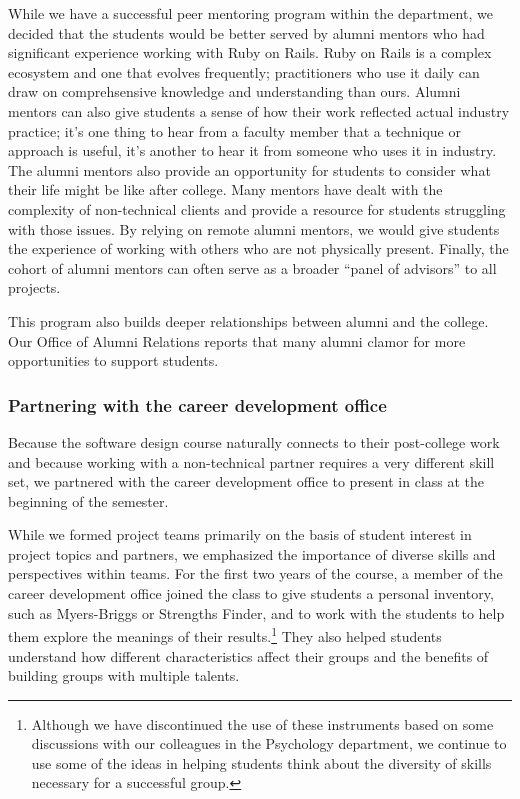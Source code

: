 While we have a successful peer mentoring program within the department,
we decided that the students would be better served by alumni mentors
who had significant experience working with Ruby on Rails.
Ruby on Rails is a complex ecosystem and one that evolves
frequently; practitioners who use it daily can draw on
comprehsensive knowledge and understanding than ours.  Alumni mentors
can also give students a sense of how their work
reflected actual industry practice; it's one thing to hear from a
faculty member that a technique or approach is useful, it's another
to hear it from someone who uses it in industry.  The
alumni mentors also provide an opportunity for students to consider
what their life might be like after college.  Many mentors have
dealt with the complexity of non-technical clients and provide a
resource for students struggling with those issues.  By relying on
remote alumni mentors, we would give students the experience of
working with others who are not physically present.  Finally, the
cohort of alumni mentors can often serve as a broader ``panel of
advisors'' to all projects.

This program also builds deeper relationships between
alumni and the college.  Our Office of Alumni Relations reports
that many alumni clamor for more opportunities to support
students.

\subsubsection{Partnering with the career development office}

Because the software design course naturally connects to their
post-college work and because working with a non-technical partner
requires a very different skill set, we partnered with the
career development office to present in class at the beginning of
the semester.

While we formed project teams primarily on the basis of student interest in 
project topics and partners, we
emphasized the importance of diverse skills and perspectives within teams.
For the first two years of the course, a member of the career 
development office joined the class to give students a personal 
inventory, such as Myers-Briggs or Strengths Finder, and to work
with the students to help them explore the meanings of their 
results.\footnote{Although we have discontinued the use of
these instruments based on some discussions with our colleagues in
the Psychology department, we continue to use some of the ideas in
helping students think about the diversity of skills necessary for
a successful group.}
They also helped students understand how different
characteristics affect their groups and the benefits of building
groups with multiple talents.

